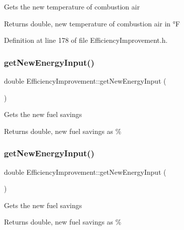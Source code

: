 Gets the new temperature of combustion air

\begin{DoxyReturn}{Returns}
double, new temperature of combustion air in °F 
\end{DoxyReturn}


Definition at line 178 of file Efficiency\+Improvement.\+h.

\mbox{\label{class_efficiency_improvement_a3c31caaed812edb8c465b53dc9029810}} 
\subsubsection{\texorpdfstring{get\+New\+Energy\+Input()}{getNewEnergyInput()}\hspace{0.1cm}{\footnotesize\ttfamily [1/3]}}
{\footnotesize\ttfamily double Efficiency\+Improvement\+::get\+New\+Energy\+Input (\begin{DoxyParamCaption}{ }\end{DoxyParamCaption})}

Gets the new fuel savings

\begin{DoxyReturn}{Returns}
double, new fuel savings as \% 
\end{DoxyReturn}
\mbox{\label{class_efficiency_improvement_a3c31caaed812edb8c465b53dc9029810}} 
\subsubsection{\texorpdfstring{get\+New\+Energy\+Input()}{getNewEnergyInput()}\hspace{0.1cm}{\footnotesize\ttfamily [2/3]}}
{\footnotesize\ttfamily double Efficiency\+Improvement\+::get\+New\+Energy\+Input (\begin{DoxyParamCaption}{ }\end{DoxyParamCaption})}

Gets the new fuel savings

\begin{DoxyReturn}{Returns}
double, new fuel savings as \% 
\end{DoxyReturn}
\mbox{\label{class_efficiency_improvement_a3c31caaed812edb8c465b53dc9029810}} 
